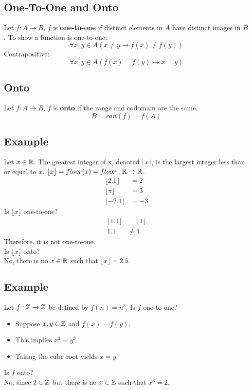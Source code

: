 \documentclass[letterpaper, 12pt]{math}
\begin{document}
\subsection*{One-To-One and Onto}
Let \( f:A\to B \), \( f \) is \textbf{one-to-one} if distinct elements in
\( A \) have distinct images in \( B \). To show a function is one-to-one:
\[ \forall{x,y}\in A (x\neq y \to f(x)\neq f(y)) \]
Contrapositive:
\[ \forall{x,y}\in A (f(x) = f(y) \to x = y) \]

\subsection*{Onto}
Let \( f:A\to B\), \( f \) is \textbf{onto} if the range and codomain are the
same.
\[ B = ran(f) = f(A) \]

\subsection*{Example}
Let \( x\in\mathbb{R} \). The greatest integer of x, denoted \( \lfloor x \rfloor \),
is the largest integer less than or equal to \( x \). \( \lfloor x \rfloor =
floor(x) = floor:\mathbb{R}\to\mathbb{R} \).
\begin{align*}
  \lfloor 2.1 \rfloor &= 2 \\
  \lfloor \pi \rfloor &= 3 \\
  \lfloor -2.1 \rfloor &= -3
\end{align*}
Is \( \lfloor x \rfloor \) one-to-one?
\begin{align*}
  \lfloor 1.1 \rfloor &= \lfloor 1 \rfloor \\
  1.1 &\neq 1
\end{align*}
Therefore, it is not one-to-one. \\
Is \( \lfloor x \rfloor \) onto? \\
No, there is no \( x\in\mathbb{R} \) such that \( \lfloor x \rfloor = 2.5 \).

\subsection*{Example}
Let \( f:\mathbb{Z}\to\mathbb{Z} \) be defined by \( f(n) = n^{3} \). Is \( f \) one-to-one?
\begin{itemize}
  \item Suppose \( x,y\in\mathbb{Z} \) and \( f(x) = f(y) \).
  \item This implies \( x^{3} = y^{3} \).
  \item Taking the cube root yields \( x = y \).
\end{itemize}
Is \( f \) onto? \\
No, since \( 2\in\mathbb{Z} \) but there is no \( x\in\mathbb{Z} \) such that \( x^{3} = 2 \).
\end{document}
